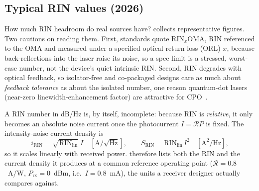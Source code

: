 \subsection{Typical RIN values (2026)}
\label{sec:rin-values}

How much RIN headroom do real sources have?  collects
representative figures. Two cautions on reading them. First, standards quote
\emph{$\mathrm{RIN}_x\mathrm{OMA}$}, RIN referenced to the OMA and measured under
a specified optical return loss (ORL) $x$, because back-reflections into the laser
raise its noise, so a spec limit is a stressed, worst-case number, not the
device's quiet intrinsic RIN. Second, RIN degrades with optical feedback, so
isolator-free and co-packaged designs care as much about \emph{feedback tolerance}
as about the isolated number, one reason quantum-dot lasers (near-zero
linewidth-enhancement factor) are attractive for CPO~\cite{qdrin}.

A RIN number in dB/Hz is, by itself, incomplete: because RIN is \emph{relative},
it only becomes an absolute noise current once the photocurrent $I=\mathcal{R}P$
is fixed. The intensity-noise current density is
\[
  i_{\text{RIN}} = \sqrt{\mathrm{RIN}_{\text{lin}}}\;I \quad[\text{A}/\sqrt{\text{Hz}}],
  \qquad
  S_{\text{RIN}} = \mathrm{RIN}_{\text{lin}}\,I^2 \quad[\text{A}^2/\text{Hz}],
\]
so it scales linearly with received power.  therefore lists
both the RIN and the current density it produces at a common reference operating
point ($\mathcal{R}=0.8$~A/W, $P_{\text{rx}}=0$~dBm, i.e.\ $I=0.8$~mA), the units a
receiver designer actually compares against.

